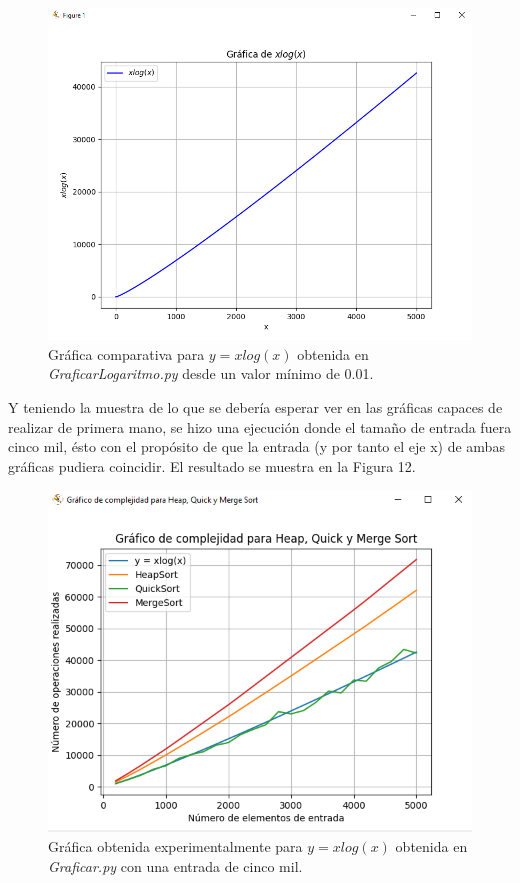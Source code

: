 \documentclass[a4paper,12pt]{article}
\begin{document}
\begin{figure}[H]
    \centering
    \includegraphics[width=.8\textwidth]{media/xlogx_desde_01.png}
    \caption{Gráfica comparativa para $y=xlog(x)$ obtenida en \textit{GraficarLogaritmo.py} desde un valor mínimo de 0.01.}
    \label{fig:nlogn-python1}
\end{figure}

Y teniendo la muestra de lo que se debería esperar ver en las gráficas capaces de realizar de primera mano, se hizo una ejecución donde el tamaño de entrada fuera cinco mil, ésto con el propósito de que la entrada (y por tanto el eje x) de ambas gráficas pudiera coincidir. El resultado se muestra en la Figura 12.

\begin{figure}[h]
    \centering
    \includegraphics[width=.8\textwidth]{media/nlogn_en_5000.png}
    \caption{Gráfica obtenida experimentalmente para $y=xlog(x)$ obtenida en \textit{Graficar.py} con una entrada de cinco mil.}
    \label{fig:nlogn-python2}
\end{figure}
\end{document}
